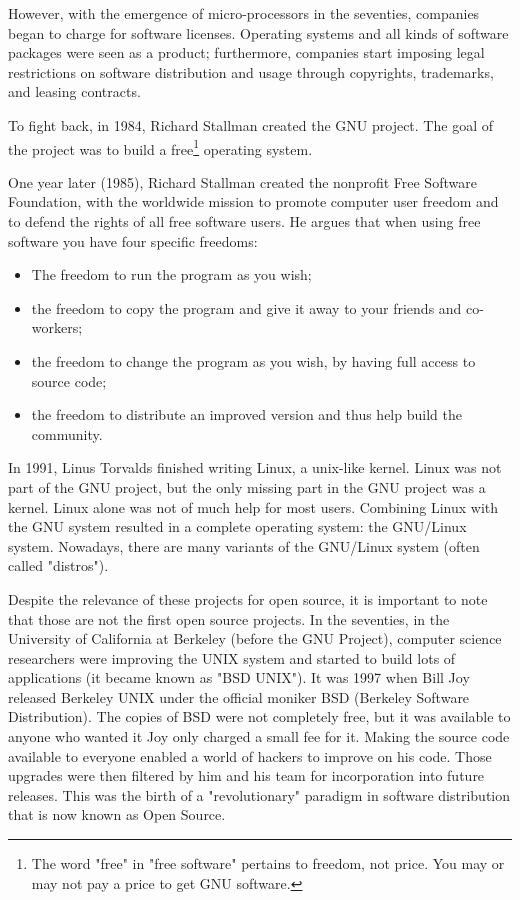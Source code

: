 However, with the emergence of micro-processors in the seventies, companies began to charge for software licenses.
Operating systems and all kinds of software packages were seen as a product; 
furthermore, companies start imposing legal restrictions on software distribution and usage through copyrights, 
trademarks, and leasing contracts.

To fight back, in 1984, Richard Stallman created the GNU project. The goal of the project was to build a 
\textsf{free}\footnote{
  The word "free" in "free software" pertains to freedom, not price. You may or may not pay a price to get GNU software.
}
operating system. 

One year later (1985), Richard Stallman created the nonprofit Free Software Foundation, with the worldwide mission to promote computer user freedom and to defend the rights of all free software users.
He argues that when using free software you have four specific freedoms:
\begin{itemize}
\item The freedom to run the program as you wish; 
\item the freedom to copy the program and give it away to your friends and co-workers; 
\item the freedom to change the program as you wish, by having full access to source code; 
\item the freedom to distribute an improved version and thus help build the community.
\end{itemize}
In 1991, Linus Torvalds finished writing Linux, a unix-like kernel.
Linux was not part of the GNU project, but the only missing part in the GNU project was a kernel.
Linux alone was not of much help for most users.
Combining Linux with the GNU system resulted in a complete operating system: the GNU/Linux system.
Nowadays, there are many variants of the GNU/Linux system (often called "distros").

Despite the relevance of these projects for open source, it is important to note that those are not the first open source projects. 
In the seventies, in the University of California at Berkeley 
(before the GNU Project), computer science researchers 
were improving the UNIX system and started to build lots of applications (it became known as "BSD UNIX").
It was 1997 when Bill Joy released Berkeley UNIX under the official moniker BSD (Berkeley Software Distribution).
The copies of BSD were not completely free, but it was available to anyone who wanted it
Joy only charged a small fee for it.
Making the source code available to everyone enabled a world of hackers to improve on his code. 
Those upgrades were then filtered by him and his team for incorporation into future releases. 
This was the birth of a "revolutionary" paradigm in software distribution that is now known as Open Source.

